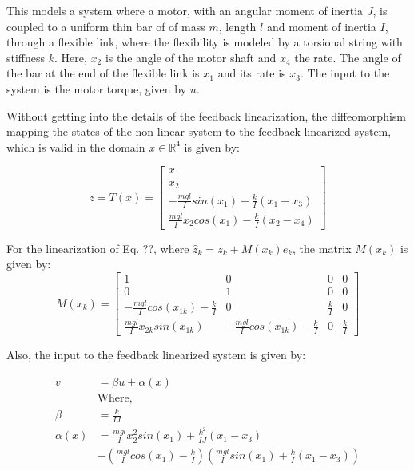 This models a system where a motor, with an angular moment of inertia $J$,  is coupled to a uniform thin bar of of mass $m$, length $l$ and moment of inertia $I$, through a flexible link, where the flexibility is modeled by a torsional string with stiffness $k$. Here, $x_2$ is the angle of the motor shaft and $x_4$ the rate. The angle of the bar at the end of the flexible link is $x_1$ and its rate  is $x_3$. The input to the system is the motor torque, given by $u$. 

Without getting into the details of the feedback linearization, the diffeomorphism mapping the states of the non-linear system to the feedback linearized system, which is valid in the domain $x \in \mathbb{R}^4$ is given by:

\begin{equation}
z = T(x) = \begin{bmatrix} x_1 \\ x_2 \\ -\frac{mgl}{I}sin(x_1) -\frac{k}{I}(x_1-x_3) \\ \frac{mgl}{I}x_2cos(x_1) - \frac{k}{I}(x_2-x_4)   \end{bmatrix}
\end{equation}

For the linearization of Eq. ??, where $\hat{z}_k = z_k + M(x_k)e_k$, the matrix $M(x_k)$ is given by:
\begin{equation}
M(x_k) = \begin{bmatrix} 1&0&0&0 \\ 0&1&0&0 \\ -\frac{mgl}{I} cos(x_{1k}) -\frac{k}{I} &0 &\frac{k}{I} &0 \\ \frac{mgl}{I}x_{2k}sin(x_{1k}) & -\frac{mgl}{I} cos(x_{1k}) - \frac{k}{I} & 0 & \frac{k}{I}     \end{bmatrix}
\end{equation}

Also, the input to the feedback linearized system is given by:

\begin{subequations}
\label{eq:fblin_inp}
\begin{align}
v&=\beta u+ \alpha(x) \\
&\text{Where,} \nonumber \\
\beta&=\frac{k}{IJ} \\
\alpha(x)&=\frac{mgl}{I}x_2^2sin(x_1) + \frac{k^2}{IJ}(x_1-x_3) \nonumber \\
&- (\frac{mgl}{I}cos(x_1)-\frac{k}{I})(\frac{mgl}{I}sin(x_1)+\frac{k}{I}(x_1-x_3))
\end{align}
\end{subequations}

